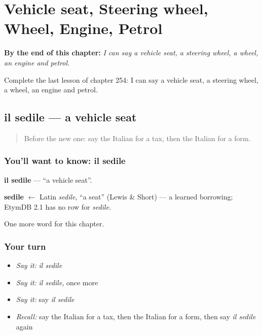 
\chapter{Vehicle seat, Steering wheel, Wheel, Engine, Petrol}
\label{ch:it-vehicle-seat-steering-wheel-wheel-engine-petrol}

\begin{chapteropening}
\textbf{By the end of this chapter:} \emph{I can say a vehicle seat, a steering wheel, a wheel, an engine and petrol.}

Complete the last lesson of chapter 254: I can say a vehicle seat, a steering wheel, a wheel, an engine and petrol.
\end{chapteropening}

\section[il sedile]{il sedile — a vehicle seat}

\label{lesson:IT-C254-sedile}



\begin{quote}
Before the new one: say the Italian for a tax, then the Italian for a form.
\end{quote}

\subsection*{You'll want to know: il sedile}
\textbf{il sedile} — \textquotedblleft{}a vehicle seat\textquotedblright{}.

\begin{cousinweb}
\textbf{sedile} $\leftarrow$ Latin \emph{sedile}, \textquotedblleft{}a seat\textquotedblright{} (Lewis \& Short) — a learned borrowing; EtymDB 2.1 has no row for \emph{sedile}.
\end{cousinweb}

\begin{grammarlens}[title={What you've built}]
One more word for this chapter.
\end{grammarlens}

\subsection*{Your turn}
\begin{itemize}
\raggedright
  \item \emph{Say it:} \emph{il sedile}
  \item \emph{Say it:} \emph{il sedile}, once more
  \item \emph{Say it:} say \emph{il sedile}
  \item \emph{Recall:} say the Italian for a tax, then the Italian for a form, then say \emph{il sedile} again
\end{itemize}

